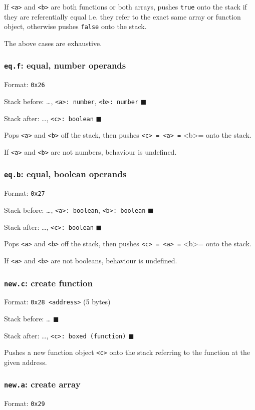 If \texttt{<a>} and \texttt{<b>} are both functions or both arrays, pushes \texttt{true} onto
the stack if they are referentially equal i.e. they refer to the exact
same array or function object, otherwise pushes \texttt{false} onto the stack.

The above cases are exhaustive.

\subsubsection{\texttt{eq.f}: equal, number operands}
\label{sec:orge0a190c}
Format: \texttt{0x26}

Stack before: \ldots{}, \texttt{<a>: number}, \texttt{<b>: number} \(\blacksquare\)

Stack after: \ldots{}, \texttt{<c>: boolean} \(\blacksquare\)

Pops \texttt{<a>} and \texttt{<b>} off the stack, then pushes \texttt{<c> = <a> =} <b>= onto
the stack.

If \texttt{<a>} and \texttt{<b>} are not numbers, behaviour is undefined.

\subsubsection{\texttt{eq.b}: equal, boolean operands}
\label{sec:org73ca0ae}
Format: \texttt{0x27}

Stack before: \ldots{}, \texttt{<a>: boolean}, \texttt{<b>: boolean} \(\blacksquare\)

Stack after: \ldots{}, \texttt{<c>: boolean} \(\blacksquare\)

Pops \texttt{<a>} and \texttt{<b>} off the stack, then pushes \texttt{<c> = <a> =} <b>= onto
the stack.

If \texttt{<a>} and \texttt{<b>} are not booleans, behaviour is undefined.

\subsubsection{\texttt{new.c}: create function}
\label{sec:org1d41a06}
Format: \texttt{0x28 <address>} (5 bytes)

Stack before: \ldots{} \(\blacksquare\)

Stack after: \ldots{}, \texttt{<c>: boxed (function)} \(\blacksquare\)

Pushes a new function object \texttt{<c>} onto the stack referring to the
function at the given address.

\subsubsection{\texttt{new.a}: create array}
\label{sec:orgcc2c694}
Format: \texttt{0x29}

